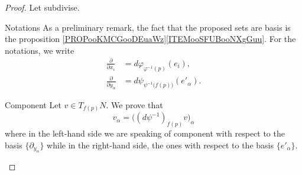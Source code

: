 \begin{proof}
    Let subdivise.
    \begin{subproof}
        \item[Notations]
            As a preliminary remark, the fact that the proposed sets are basis is the proposition \ref{PROPooKMCGooDEuaWz}\ref{ITEMooSFUBooNXgGuu}. For the notations, we write
            \begin{subequations}
                \begin{align}
                    \frac{ \partial  }{ \partial x_i }&=d\varphi_{\varphi^{-1}(p)}(e_i),\\
                    \frac{ \partial  }{ \partial y_{\alpha} }&=d\psi_{\psi^{-1}\big( f(p) \big)}(e'_{\alpha}).
                \end{align}
            \end{subequations}
        \item[Component]
            Let \( v\in T_{f(p)}N\). We prove that
            \begin{equation}        \label{EQooISXNooJOzUmS}
                v_{\alpha}=\Big( (d\psi^{-1})_{f(p)}v \Big)_{\alpha}
            \end{equation}
            where in the left-hand side we are speaking of component with respect to the basis \( \{ \partial_{y_{\alpha}} \}\) while in the right-hand side, the ones with respect to the basis \( \{ e'_{\alpha} \}\).


\end{subproof}
\end{proof}
